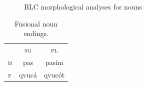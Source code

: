 \begin{description}
\begin{figure}[ht]
\begin{mdframed}
\begin{tabbing}
\end{tabbing}
\caption{BLC morphological analyses for nouns}
\label{fig:blc-nouns}
\end{mdframed}
\end{figure}
   
   \begin{table}[ht]
      \small
      \centering
       \setlength{\extrarowheight}{6pt}
      \begin{tabular}{ccc} 
 \toprule
 &  \textsc{sg} & \textsc{pl}\\
\cmidrule(lr){2-3} 
\textsc{m} & pas & pas\'{i}m \\
\textsc{f}  &	qvuc\'{a}	& qvuc\'ot \\	
    \bottomrule
    \end{tabular}
    \label{tab:abs-only}
    \caption{Fusional noun endings.}
    \end{table}
    

\end{description}
